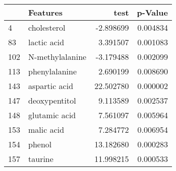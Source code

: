 \begin{tabular}{llrr}
\toprule
 & Features & test & p-Value \\
\midrule
4 & cholesterol & -2.898699 & 0.004834 \\
83 & lactic acid & 3.391507 & 0.001083 \\
102 & N-methylalanine & -3.179488 & 0.002099 \\
113 & phenylalanine & 2.690199 & 0.008690 \\
143 & aspartic acid & 22.502780 & 0.000002 \\
147 & deoxypentitol & 9.113589 & 0.002537 \\
148 & glutamic acid & 7.561097 & 0.005964 \\
153 & malic acid & 7.284772 & 0.006954 \\
154 & phenol & 13.182680 & 0.000283 \\
157 & taurine & 11.998215 & 0.000533 \\
\bottomrule
\end{tabular}
